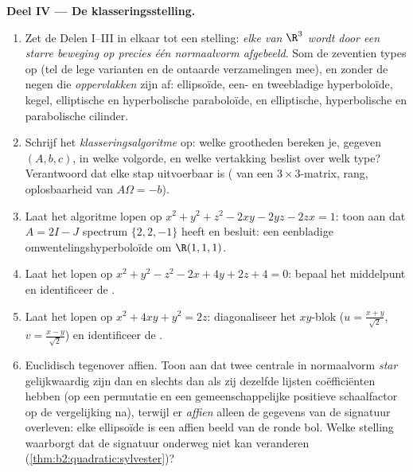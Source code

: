 \begin{problem}
\medskip
\noindent\textbf{Deel IV --- De klasseringsstelling.}
\begin{enumerate}[resume]
  \item Zet de Delen I--III in elkaar tot een stelling: \emph{elke
         van $\R^3$ wordt door een starre beweging op
        precies één normaalvorm afgebeeld}. Som de zeventien
         types op (tel de lege varianten en de ontaarde
        verzamelingen mee), en zonder de negen  die
        \emph{oppervlakken} zijn af: ellipsoïde, een- en
        tweebladige hyperboloïde, kegel, elliptische en
        hyperbolische paraboloïde, en elliptische, hyperbolische
        en parabolische cilinder.
  \item Schrijf het \emph{klasseringsalgoritme} op: welke
        grootheden bereken je, gegeven $(A, b, c)$, in welke
        volgorde, en welke vertakking beslist over welk type?
        Verantwoord dat elke stap uitvoerbaar is ( van
        een  $3\times3$-matrix, rang, oplosbaarheid
        van $A\Omega = -b$).
  \item Laat het algoritme lopen op $x^2 + y^2 + z^2 - 2xy - 2yz -
        2zx = 1$: toon aan dat $A = 2I - J$ spectrum $\{2, 2,
        -1\}$ heeft en besluit: een eenbladige
        omwentelingshyperboloïde om $\R(1,1,1)$.
  \item Laat het lopen op $x^2 + y^2 - z^2 - 2x + 4y + 2z + 4 =
        0$: bepaal het middelpunt en identificeer de .
  \item Laat het lopen op $x^2 + 4xy + y^2 = 2z$: diagonaliseer
        het $xy$-blok ($u = \frac{x+y}{\sqrt2}$, $v =
        \frac{x-y}{\sqrt2}$) en identificeer de .
  \item Euclidisch tegenover affien. Toon aan dat twee centrale
         in normaalvorm \emph{star} gelijkwaardig zijn
        dan en slechts dan als zij dezelfde lijsten coëfficiënten
        hebben (op een permutatie en een gemeenschappelijke
        positieve schaalfactor op de vergelijking na), terwijl er
        \emph{affien} alleen de gegevens van de signatuur
        overleven: elke ellipsoïde is een affien beeld van de
        ronde bol. Welke stelling waarborgt dat de signatuur
        onderweg niet kan veranderen
        (\cref{thm:b2:quadratic:sylvester})?
\end{enumerate}


\end{problem}
